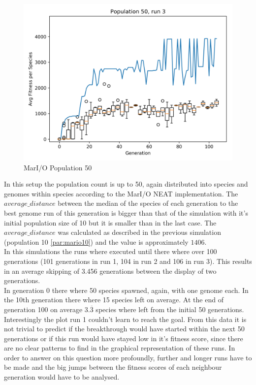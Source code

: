 \begin{figure}[h]
\begin{minipage}{0.33\textwidth}
				\end{minipage}
				\begin{minipage}{0.33\textwidth}
					\centering
					\includegraphics[width=1\textwidth]{graphics/mario/pop50_run3} %
				\end{minipage}
				\caption{MarI/O Population 50}
				\label{fig:mario50}
			\end{figure}
			In this setup the population count is up to 50, again distributed into species and genomes within species according to the MarI/O NEAT implementation. The $average\_distance$  between the median of the species of each generation to the best genome run of this generation is bigger than that of the simulation with it's initial population size of 10 but it is smaller than in the last case. The $average\_distance$ was calculated as described in the previous simulation (population 10 \ref{par:mario10}) and the value is approximately $1406$.\\
			In this simulations the runs where executed until there where over 100 generations (101 generations in run 1, 104 in run 2 and 106 in run 3). This results in an average skipping of 3.456 generations between the display of two generations.\\
			In generation 0 there where 50 species spawned, again, with one genome each. In the 10th generation there where 15 species left on average. At the end of generation 100 on average $3.\overline{3}$ species where left from the initial 50 generations.\\
			Interestingly the plot run 1 couldn't learn to reach the goal. From this data it is not trivial to predict if the breakthrough would have started within the next 50 generations or if this run would have stayed low in it's fitness score, since there are no clear patterns to find in the graphical representation of these runs. In order to answer on this question more profoundly, further and longer runs have to be made and the big jumps between the fitness scores of each neighbour generation would have to be analysed.\\
